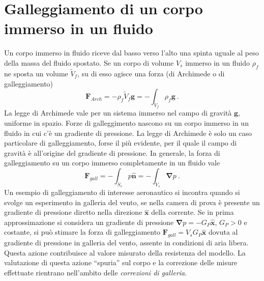 \section{Galleggiamento di un corpo immerso in un fluido}
Un corpo immerso in fluido riceve dal basso verso l'alto una spinta uguale al peso della massa del fluido spostato. Se un corpo di volume $V_s$ immerso in un fluido $\rho_f$ ne sposta un volume $\tilde{V}_f$, su di esso agisce una forza (di Archimede o di galleggiamento)
\begin{equation}
    \bm{F}_{Arch} = - \rho_f \tilde{V}_f \bm{g} = - \int_{\tilde{V}_f} \rho_f \bm{g} \ .
\end{equation}
La legge di Archimede vale per un sistema immerso nel campo di gravità $\bm{g}$, uniforme in spazio.
\newline \noindent
Forze di galleggimento nascono su un corpo immerso in un fluido in cui c'è un gradiente di pressione. La legge di Archimede è solo un caso particolare di galleggiamento, forse il più evidente, per il quale il campo di gravità è all'origine del gradiente di pressione. In generale, la forza di galleggiamento su un corpo immerso completamente in un fluido vale
\begin{equation}
    \bm{F}_{gall} = -\int_{S_s} p \bm{\hat{n}} = - \int_{V_s} \bm{\nabla} p \ .
\end{equation}
Un esempio di galleggiamento di interesse aeronautico si incontra quando si svolge un esperimento in galleria del vento, se nella camera di prova è presente un gradiente di pressione diretto nella direzione $\bm{\hat{x}}$ della corrente. Se in prima approssimazione si considera un gradiente di pressione $\bm{\nabla}p = - G_P \bm{\hat{x}}$, $G_P>0$ e costante, si può stimare la forza di galleggiamento $\bm{F}_{gall} = V_s G_P \bm{\hat{x}}$ dovuta al gradiente di pressione in galleria del vento, assente in condizioni di aria libera. Questa azione contribuisce al valore misurato della resistenza del modello.
%
La valutazione di questa azione ``spuria'' sul corpo e la correzione delle misure effettuate rientrano nell'ambito delle \textit{correzioni di galleria}.




